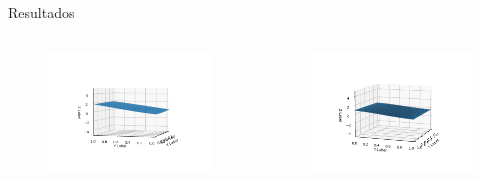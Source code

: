 \documentclass[aspectratio=169,xcolor=dvipsnames]{beamer}
\begin{document}
\begin{frame}{Resultados}
	\begin{columns}[c] %
		
		\begin{figure}
			\centering
			\includegraphics[width=\linewidth]{images/Sol_DGM.png}
		\end{figure}
		
		\vspace*{4mm}
		\begin{figure}
			\centering
			\includegraphics[width=\linewidth]{images/Interp_sol2.png}
		\end{figure}
	\end{columns}
\end{frame}
\end{document}
